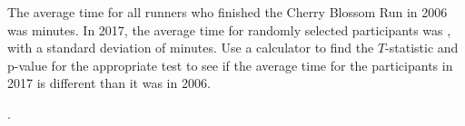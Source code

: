 \begin{exercisewrap}
\begin{nexercise}
The average time for all runners who finished the Cherry Blossom Run in 2006 was \cherryblossomnull{} minutes. In 2017, the average time for \cherryblossomn{} randomly selected participants was \cherryblossommean{}, with a standard deviation of \cherryblossomsd{} minutes. Use a calculator to find the $T$-statistic and p-value for the appropriate test to see if the average time for the participants in 2017 is different than it was in 2006.\footnotemark
\end{nexercise}
\end{exercisewrap}

.

\D{\newpage}

